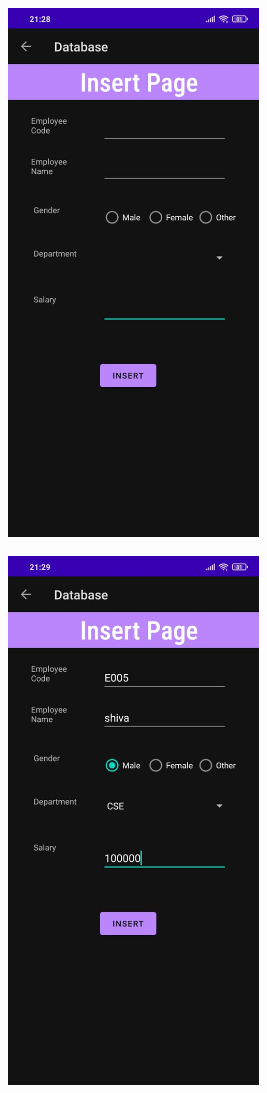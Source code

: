 \documentclass[12pt,letterpaper]{article}
\begin{document}
\newpage
\subsubsection*{}
\begin{figure}[h]
    \centering
    \includegraphics[height=14cm, keepaspectratio]{Outputs/OP3.jpeg}
\end{figure}
\begin{figure}
    \centering
    \includegraphics[height=14cm, keepaspectratio]{Outputs/OP4.jpeg}
\end{figure}
\end{document}
